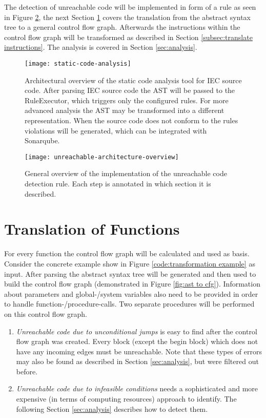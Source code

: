 The detection of unreachable code will be implemented in form of a rule as seen in Figure \ref{fig:unreachable-architecture-overview}, the next Section \ref{sec:translation} covers the translation from the abstract syntax tree to a general control flow graph. 
Afterwards the instructions within the control flow graph will be transformed as described in Section \ref{subsec:translate instructions}.
The analysis is covered in Section \ref{sec:analysis}.

\begin{figure}[h!]
	\centering
	\texttt{[image: static-code-analysis]}
	\caption{Architectural overview of the static code analysis tool for IEC source code. After parsing IEC source code the AST will be passed to the RuleExecutor, which triggers only the configured rules. For more advanced analysis the AST may be transformed into a different representation. When the source code does not conform to the rules violations will be generated, which can be integrated with Sonarqube.}
	\label{fig:general architecture}
\end{figure}

\begin{figure}[h!]
	\centering
	\texttt{[image: unreachable-architecture-overview]}
	\caption{General overview of the implementation of the unreachable code detection rule. Each step is annotated in which section it is described. }
	\label{fig:unreachable-architecture-overview}
\end{figure}

\section{Translation of Functions}
\label{sec:translation}
For every function the control flow graph will be calculated and used as basis. 
Consider the concrete example show in Figure \ref{code:transformation example} as input. 
After parsing the abstract syntax tree will be generated and then used to build the control flow graph (demonstrated in Figure \ref{fig:ast to cfg}).
Information about parameters and global-/system variables also need to be provided in order to handle function-/procedure-calls. 
Two separate procedures will be performed on this control flow graph.
\begin{enumerate}
	\item \emph{Unreachable code due to unconditional jumps} is easy to find after the control flow graph was created. Every block (except the begin block) which does not have any incoming edges must be unreachable.
	Note that these types of errors may also be found as described in Section \ref{sec:analysis}, but were filtered out before.
	\item \emph{Unreachable code due to infeasible conditions} needs a sophisticated and more expensive (in terms of computing resources) approach to identify. The following Section \ref{sec:analysis} describes how to detect them.
\end{enumerate}

